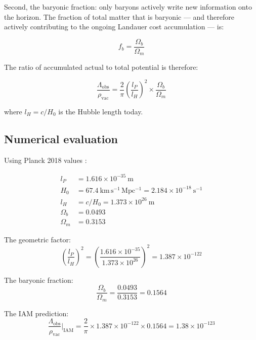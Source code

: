 \documentclass[12pt,a4paper]{article}
\begin{document}
Second, the baryonic fraction: only baryons actively write new
information onto the horizon. The fraction of total matter that is
baryonic — and therefore actively contributing to the ongoing Landauer
cost accumulation — is:

\begin{equation}
f_b = \frac{\Omega_b}{\Omega_m}
\label{eq:f_b}
\end{equation}

The ratio of accumulated actual to total potential is therefore:

\begin{equation}
\frac{\Lambda_\mathrm{obs}}{\rho_\mathrm{vac}} =
\frac{2}{\pi}\left(\frac{l_P}{l_H}\right)^2 \times \frac{\Omega_b}{\Omega_m}
\label{eq:prediction}
\end{equation}

where $l_H = c/H_0$ is the Hubble length today.

\subsection{Numerical evaluation}

Using Planck 2018 values \citep{planck2020}:

\begin{align}
l_P &= 1.616 \times 10^{-35}\ \mathrm{m} \\
H_0 &= 67.4\ \mathrm{km\,s^{-1}\,Mpc^{-1}} = 2.184 \times 10^{-18}\
\mathrm{s}^{-1} \\
l_H &= c/H_0 = 1.373 \times 10^{26}\ \mathrm{m} \\
\Omega_b &= 0.0493 \\
\Omega_m &= 0.3153
\end{align}

The geometric factor:
\begin{equation}
\left(\frac{l_P}{l_H}\right)^2 =
\left(\frac{1.616 \times 10^{-35}}{1.373 \times 10^{26}}\right)^2
= 1.387 \times 10^{-122}
\label{eq:geo_factor}
\end{equation}

The baryonic fraction:
\begin{equation}
\frac{\Omega_b}{\Omega_m} = \frac{0.0493}{0.3153} = 0.1564
\label{eq:baryon_fraction}
\end{equation}

The IAM prediction:
\begin{equation}
\frac{\Lambda_\mathrm{obs}}{\rho_\mathrm{vac}}\bigg|_\mathrm{IAM} =
\frac{2}{\pi} \times 1.387 \times 10^{-122} \times 0.1564 = 1.38 \times 10^{-123}
\label{eq:result}
\end{equation}
\end{document}
